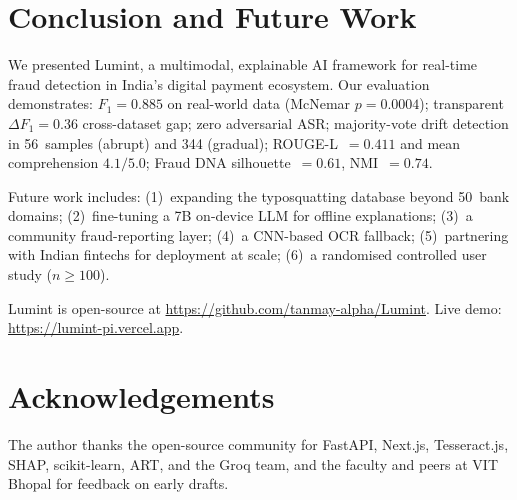 \documentclass[conference]{IEEEtran}
\begin{document}
\section{Conclusion and Future Work}

\vspace{3mm}
We presented Lumint, a multimodal, explainable AI framework for
real-time fraud detection in India's digital payment ecosystem. Our
evaluation demonstrates: $F_1{=}0.885$ on real-world data (McNemar
$p{=}0.0004$); transparent $\Delta F_1{=}0.36$ cross-dataset gap;
zero adversarial ASR; majority-vote drift detection in 56~samples
(abrupt) and 344 (gradual); ROUGE-L~$=0.411$ and mean comprehension
$4.1/5.0$; Fraud DNA silhouette~$=0.61$, NMI~$=0.74$.

\vspace{2mm}

Future work includes: (1)~expanding the typosquatting database beyond
50~bank domains; (2)~fine-tuning a 7B on-device LLM for offline
explanations; (3)~a community fraud-reporting layer; (4)~a CNN-based
OCR fallback; (5)~partnering with Indian fintechs for deployment at
scale; (6)~a randomised controlled user study ($n{\geq}100$).

\vspace{3mm}

Lumint is open-source at \url{https://github.com/tanmay-alpha/Lumint}.
Live demo: \url{https://lumint-pi.vercel.app}.

\section*{Acknowledgements}
\vspace{2mm}
The author thanks the open-source community for FastAPI, Next.js,
Tesseract.js, SHAP, scikit-learn, ART, and the Groq team, and the
faculty and peers at VIT Bhopal for feedback on early drafts.
\end{document}
